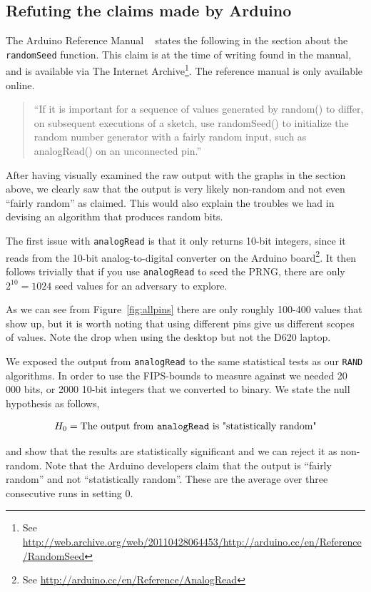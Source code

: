 \documentclass[a4paper]{article}           %
\begin{document}
\subsection{Refuting the claims made by Arduino}
\label{sec:refuting}


The Arduino Reference Manual ~\cite{ardref} states the following in the section about the \texttt{randomSeed} function. This claim is at the time of writing found in the manual, and is available via The Internet Archive\footnote{See \url{http://web.archive.org/web/20110428064453/http://arduino.cc/en/Reference/RandomSeed}}. The reference manual is only available online. 

\begin{quote}
``If it is important for a sequence of values generated by random() to differ, on subsequent executions of a sketch, use randomSeed() to initialize the random number generator with a fairly random input, such as analogRead() on an unconnected pin.''
\end{quote}

After having visually examined the raw output with the graphs in the section above, we clearly saw that the output is very likely non-random and not even ``fairly random'' as claimed. This would also explain the troubles we had in devising an algorithm that produces random bits. 

The first issue with \texttt{analogRead} is that it only returns 10-bit integers, since it reads from the 10-bit analog-to-digital converter on the Arduino board\footnote{See \url{http://arduino.cc/en/Reference/AnalogRead}}. It then follows trivially that if you use \texttt{analogRead} to seed the PRNG, there are only $2^{10} = 1024$ seed values for an adversary to explore. 

As we can see from Figure~\ref{fig:allpins} there are only roughly 100-400 values that show up, but it is worth noting that using different pins give us different scopes of values. Note the drop when using the desktop but not the D620 laptop. 

We exposed the output from \texttt{analogRead} to the same statistical tests as our \texttt{RAND} algorithms. In order to use the FIPS-bounds to measure against we needed 20 000 bits, or 2000 10-bit integers that we converted to binary. We state the null hypothesis as follows, 

\[
H_0 = \text{The output from \texttt{analogRead} is "statistically random"}
\]

and show that the results are statistically significant and we can reject it as non-random. Note that the Arduino developers claim that the output is ``fairly random'' and not ``statistically random''. These are the average over three consecutive runs in setting 0. 
\end{document}
